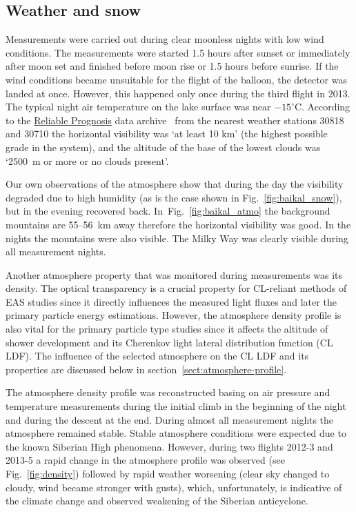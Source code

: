 \documentclass[universe,article,submit,moreauthors,pdftex]{Definitions/mdpi}
\begin{document}

\subsection{Weather and snow}

Measurements were carried out during clear moonless nights with low wind conditions. The measurements were started 1.5 hours after sunset or immediately after moon set and finished before moon rise or 1.5 hours before sunrise. If the wind conditions became unsuitable for the flight of the balloon, the detector was landed at once. However, this happened only once during the third flight in 2013. The typical night air temperature on the lake surface was near $-15^\circ$C. According to the \href{https://rp5.ru/Weather_in_the_world}{Reliable Prognosis} data archive~\cite{rp5} from the nearest weather stations 30818 and 30710 the horizontal visibility was `at least 10 km' (the highest possible grade in the system), and the altitude of the base of the lowest clouds was `2500~m or more or no clouds present'.

Our own observations of the atmosphere show that during the day the visibility degraded due to high humidity (as is the case shown in Fig.~\ref{fig:baikal_snow}), but in the evening recovered back. In~Fig.~\ref{fig:baikal_atmo} the background mountains are 55--56~km away therefore the horizontal visibility was good. In the nights the mountains were also visible. The Milky Way was clearly visible during all measurement nights. 

Another atmosphere property that was monitored during measurements was its density. The optical transparency is a crucial property for CL-reliant methods of EAS studies since it directly influences the measured light fluxes and later the primary particle energy estimations. However, the atmosphere density profile is also vital for the primary particle type studies since it affects the altitude of shower development and its Cherenkov light lateral distribution function (CL LDF). The influence of the selected atmosphere on the CL LDF and its properties are discussed below in section~\ref{sect:atmosphere-profile}.

The atmosphere density profile was reconstructed basing on air pressure and temperature measurements during the initial climb in the beginning of the night and during the descent at the end. During almost all measurement nights the atmosphere remained stable. Stable atmosphere conditions were expected due to the known Siberian High phenomena. However, during two flights 2012-3 and 2013-5 a rapid change in the atmosphere profile was observed (see Fig.~\ref{fig:density}) followed by rapid weather worsening (clear sky changed to cloudy, wind became stronger with gusts), which, unfortunately, is indicative of the climate change and observed weakening of the Siberian anticyclone. 
\end{document}

